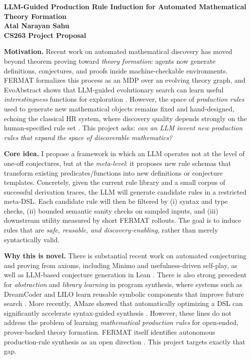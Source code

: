 \documentclass[10pt]{article}
\begin{document}
\begin{center}
{\Large \textbf{LLM-Guided Production Rule Induction for Automated Mathematical Theory Formation}}\\
\vspace{2mm}
\textbf{Atal Narayan Sahu}\\
\textbf{CS263 Project Proposal}
\end{center}

\textbf{Motivation.}
Recent work on automated mathematical discovery has moved beyond theorem proving toward \emph{theory formation}: agents now generate definitions, conjectures, and proofs inside machine-checkable environments. FERMAT formalizes this process as an MDP over an evolving theory graph, and EvoAbstract shows that LLM-guided evolutionary search can learn useful \emph{interestingness} functions for exploration \cite{tsoukalas2025fermat}. However, the space of \emph{production rules} used to generate new mathematical objects remains fixed and hand-designed, echoing the classical HR system, where discovery quality depends strongly on the human-specified rule set \cite{tsoukalas2025fermat,colton1999hr}. This project asks: \emph{can an LLM invent new production rules that expand the space of discoverable mathematics?}

\textbf{Core idea.}
I propose a framework in which an LLM operates not at the level of one-off conjectures, but at the \emph{meta-level}: it proposes new rule schemas that transform existing predicates/functions into new definitions or conjecture templates. Concretely, given the current rule library and a small corpus of successful derivation traces, the LLM will generate candidate rules in a restricted meta-DSL. Each candidate rule will then be filtered by (i) syntax and type checks, (ii) bounded semantic sanity checks on sampled inputs, and (iii) downstream utility measured by short FERMAT rollouts. The goal is to induce rules that are \emph{safe, reusable, and discovery-enabling}, rather than merely syntactically valid.

\textbf{Why this is novel.}
There is substantial recent work on automated conjecturing and proving from axioms, including Minimo and usefulness-driven self-play, as well as LLM-based conjecture generation in Lean \cite{poesia2024minimo,kasriel2025usefulness,onda2025leanconjecturer}. There is also strong precedent for \emph{abstraction} and \emph{library learning} in program synthesis, where systems such as DreamCoder and LILO learn reusable symbolic components that improve future search \cite{ellis2021dreamcoder,grand2023lilo}. More recently, AMaze showed that automatically optimizing a DSL can significantly accelerate syntax-guided synthesis \cite{ye2026amaze}. However, these lines do not address the problem of learning \emph{mathematical production rules} for open-ended, prover-backed theory formation. FERMAT itself identifies autonomous production-rule synthesis as an open direction \cite{tsoukalas2025fermat}. This project targets exactly that gap.
\end{document}

